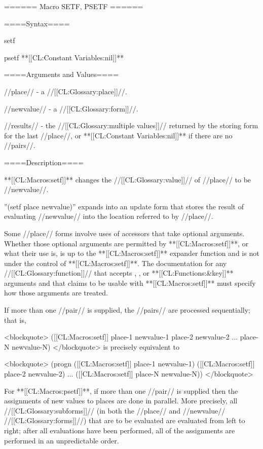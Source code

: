 ====== Macro SETF, PSETF ======

====Syntax====

\DefmacWithValues setf {} {}

\DefmacWithValues psetf {} {**[[CL:Constant Variables:nil]]**}


====Arguments and Values====

//place// - a //[[CL:Glossary:place]]//.

//newvalue// - a //[[CL:Glossary:form]]//.


//results// - the //[[CL:Glossary:multiple values]]// returned by the storing form for the last //place//, or **[[CL:Constant Variables:nil]]** if there are no //pairs//.

====Description====

**[[CL:Macros:setf]]** changes the //[[CL:Glossary:value]]// of //place// to be //newvalue//.

''(setf place newvalue)'' expands into an update form that stores the result of evaluating //newvalue// into the location referred to by //place//.

Some //place// forms involve uses of accessors that take optional arguments. Whether those optional arguments are permitted by **[[CL:Macros:setf]]**, or what their use is, is up to the **[[CL:Macros:setf]]** expander function and is not under the control of **[[CL:Macros:setf]]**. The documentation for any //[[CL:Glossary:function]]// that accepts , , or **[[CL:Functions:&key]]** arguments and that claims to be usable with **[[CL:Macros:setf]]** must specify how those arguments are treated.



If more than one //pair// is supplied, the //pairs// are processed sequentially; that is,

<blockquote> ([[CL:Macros:setf]] place-1 newvalue-1 place-2 newvalue-2 ... place-N newvalue-N) </blockquote> is precisely equivalent to

<blockquote> (progn ([[CL:Macros:setf]] place-1 newvalue-1) ([[CL:Macros:setf]] place-2 newvalue-2) ... ([[CL:Macros:setf]] place-N newvalue-N)) </blockquote>

For **[[CL:Macros:psetf]]**, if more than one //pair// is supplied then the assignments of new values to places are done in parallel. More precisely, all //[[CL:Glossary:subforms]]// (in both the //place// and //newvalue// //[[CL:Glossary:forms]]//) that are to be evaluated are evaluated from left to right; after all evaluations have been performed, all of the assignments are performed in an unpredictable order.

